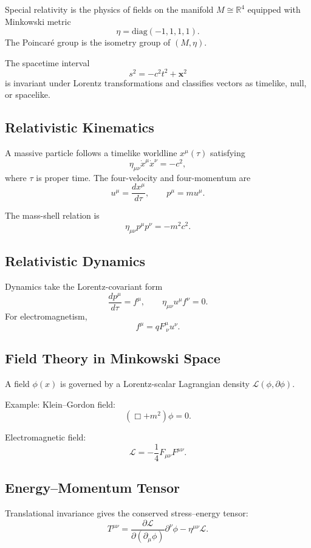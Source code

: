 \documentclass[12pt]{article}
\begin{document}
Special relativity is the physics of fields on the manifold 
$M \cong \mathbb{R}^4$ equipped with Minkowski metric
\[
\eta = \mathrm{diag}(-1,1,1,1).
\]
The Poincar\'e group is the isometry group of $(M,\eta)$.

The spacetime interval
\[
s^2 = -c^2 t^2 + \mathbf{x}^2
\]
is invariant under Lorentz transformations and classifies vectors as timelike,
null, or spacelike.

\subsection{Relativistic Kinematics}

A massive particle follows a timelike worldline $x^\mu(\tau)$ satisfying
\[
\eta_{\mu\nu} \dot{x}^\mu \dot{x}^\nu = -c^2,
\]
where $\tau$ is proper time.
The four-velocity and four-momentum are
\[
u^\mu=\frac{dx^\mu}{d\tau}, \qquad 
p^\mu = m u^\mu.
\]

The mass-shell relation is
\[
\eta_{\mu\nu}p^\mu p^\nu = -m^2 c^2.
\]

\subsection{Relativistic Dynamics}

Dynamics take the Lorentz-covariant form
\[
\frac{dp^\mu}{d\tau} = f^\mu,
\qquad \eta_{\mu\nu}u^\mu f^\nu = 0.
\]
For electromagnetism,
\[
f^\mu = q F^\mu_{\ \nu} u^\nu.
\]

\subsection{Field Theory in Minkowski Space}

A field $\phi(x)$ is governed by a Lorentz-scalar Lagrangian density 
$\mathcal{L}(\phi,\partial\phi)$.

Example: Klein--Gordon field:
\[
(\Box + m^2)\phi = 0.
\]

Electromagnetic field:
\[
\mathcal{L} = -\frac14 F_{\mu\nu}F^{\mu\nu}.
\]

\subsection{Energy--Momentum Tensor}

Translational invariance gives the conserved stress--energy tensor:
\[
T^{\mu\nu} = 
\frac{\partial \mathcal{L}}{\partial(\partial_\mu \phi)}\partial^\nu\phi
-\eta^{\mu\nu}\mathcal{L}.
\]
\end{document}
